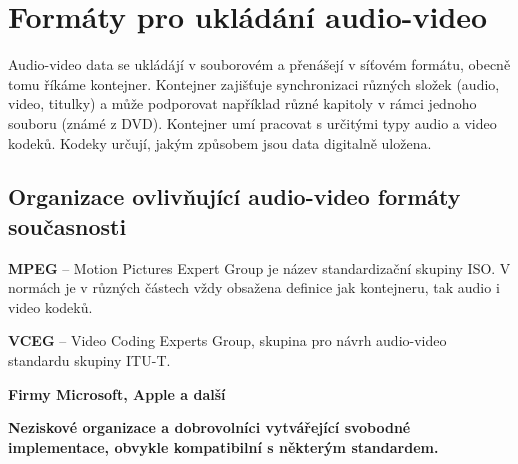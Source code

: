 \chapter{Formáty pro ukládání audio-video}
Audio-video data se ukládájí v souborovém a přenášejí v síťovém formátu, obecně tomu říkáme kontejner. Kontejner zajišťuje synchronizaci různých složek (audio, video, titulky) a může podporovat například různé kapitoly v rámci jednoho souboru (známé z DVD). Kontejner umí pracovat s určitými typy audio a video kodeků. Kodeky určují, jakým způsobem jsou data digitalně uložena. 
\section{Organizace ovlivňující audio-video formáty současnosti}
\bitem
\item\textbf{MPEG} -- Motion Pictures Expert Group je název standardizační skupiny ISO. V normách je v různých částech vždy obsažena definice jak kontejneru, tak audio i video kodeků.
\item\textbf{VCEG} -- Video Coding Experts Group, skupina pro návrh audio-video standardu skupiny ITU-T.
\item\textbf{Firmy Microsoft, Apple a další}
\item\textbf{Neziskové organizace a dobrovolníci vytvářející svobodné implementace, obvykle kompatibilní s některým standardem.}
\eitem
